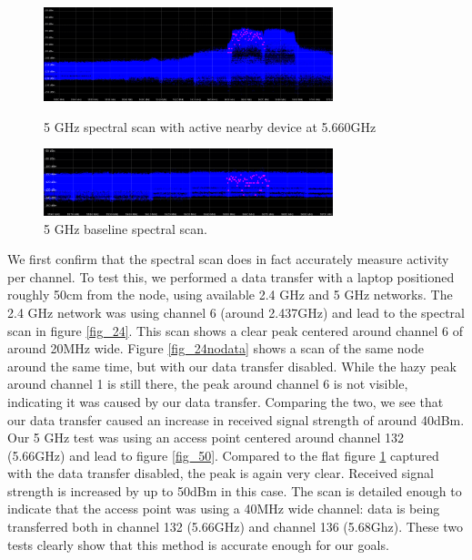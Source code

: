 \documentclass[a4paper, 11pt]{article}
\begin{document}
\begin{figure}[ht]
\centering
\includegraphics[width=0.75\textwidth]{50check.png}
\caption{5 GHz spectral scan with active nearby device at 5.660GHz}
\label{fig_50}

\centering
\includegraphics[width=0.75\textwidth]{50check_nodata.png}
\caption{5 GHz baseline spectral scan.}
\label{fig_50nodata}
\end{figure}
We first confirm that the spectral scan does in fact accurately measure activity per channel. To test this, we performed a data transfer with a laptop positioned roughly 50cm from the node, using available 2.4 GHz and 5 GHz networks. The 2.4 GHz network was using channel 6 (around 2.437GHz) and lead to the spectral scan in figure \ref{fig_24}. This scan shows a clear peak centered around channel 6 of around 20MHz wide. Figure \ref{fig_24nodata} shows a scan of the same node around the same time, but with our data transfer disabled. While the hazy peak around channel 1 is still there, the peak around channel 6 is not visible, indicating it was caused by our data transfer. Comparing the two, we see that our data transfer caused an increase in received signal strength of around 40dBm.\\ Our 5 GHz test was using an access point centered around channel 132 (5.66GHz) and lead to figure \ref{fig_50}. Compared to the flat figure \ref{fig_50nodata} captured with the data transfer disabled, the peak is again very clear. Received signal strength is increased by up to 50dBm in this case. The scan is detailed enough to indicate that the access point was using a 40MHz wide channel: data is being transferred both in channel 132 (5.66GHz) and channel 136 (5.68Ghz). These two tests clearly show that this method is accurate enough for our goals.
\end{document}
